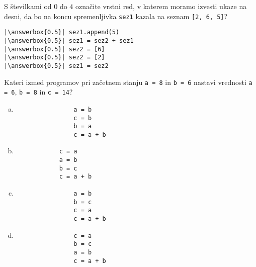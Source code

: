 \documentclass[arhiv, 10pt]{../izpit}
\newcommand{\inlinepy}[1]{\texttt{#1}}
\newcommand{\answerbox}[1]{\framebox{\vphantom{\large M}\hspace{#1cm}}}
\begin{document}
        \naloga*
        \begin{multicols}{2}
        \noindent 
        S številkami od $0$ do $4$ označite vrstni red, v katerem moramo izvesti ukaze na desni, da bo na koncu spremenljivka \inlinepy{sez1} kazala na seznam \inlinepy{[2, 6, 5]}?
    
        \columnbreak
        \noindent
        \begin{verbatim}
|\answerbox{0.5}| sez1.append(5)
|\answerbox{0.5}| sez1 = sez2 + sez1
|\answerbox{0.5}| sez2 = [6]
|\answerbox{0.5}| sez2 = [2]
|\answerbox{0.5}| sez1 = sez2

        \end{verbatim}
        \end{multicols}
    
            
        \naloga*
        
        Kateri izmed programov pri začetnem stanju
            \inlinepy{a = 8} in
            \inlinepy{b = 6}
        nastavi vrednosti
            \inlinepy{a = 6},
            \inlinepy{b = 8} in
            \inlinepy{c = 14}?
    
        \begin{multicols}{4}
        \begin{enumerate}[(a)]
\item 
                \begin{verbatim}
                a = b
                c = b
                b = a
                c = a + b
                \end{verbatim}
            
\item 
            \begin{verbatim}
            c = a
            a = b
            b = c
            c = a + b
            \end{verbatim}
        
\item 
                \begin{verbatim}
                a = b
                b = c
                c = a
                c = a + b
                \end{verbatim}
            
\item 
                \begin{verbatim}
                c = a
                b = c
                a = b
                c = a + b
                \end{verbatim}
            
\end{enumerate}

        \end{multicols}
    
\end{document}
